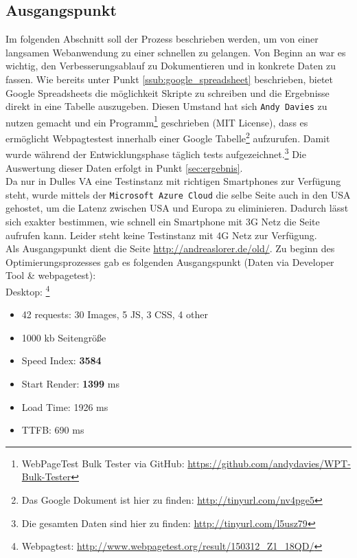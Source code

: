 	\subsection{Ausgangspunkt}
	\label{sub:ausgangspunkt}
		Im folgenden Abschnitt soll der Prozess beschrieben werden, um von einer langsamen Webanwendung zu einer schnellen zu gelangen. Von Beginn an war es wichtig, den Verbesserungsablauf zu Dokumentieren und in konkrete Daten zu fassen. Wie bereits unter Punkt \ref{ssub:google_spreadsheet} beschrieben, bietet Google Spreadsheets die möglichkeit Skripte zu schreiben und die Ergebnisse direkt in eine Tabelle auszugeben. Diesen Umstand hat sich \texttt{Andy Davies} zu nutzen gemacht und ein Programm\footnote{WebPageTest Bulk Tester via GitHub: \url{https://github.com/andydavies/WPT-Bulk-Tester}} geschrieben (MIT License), dass es ermöglicht Webpagtestest innerhalb einer Google Tabelle\footnote{Das Google Dokument ist hier zu finden: \url{http://tinyurl.com/nv4pge5}} aufzurufen. Damit wurde während der Entwicklungsphase täglich tests aufgezeichnet.\footnote{Die gesamten Daten sind hier zu finden: \url{http://tinyurl.com/l5usz79}} Die Auswertung dieser Daten erfolgt in Punkt \ref{sec:ergebnis}.\\

		Da nur in Dulles VA eine Testinstanz mit richtigen Smartphones zur Verfügung steht, wurde mittels der \texttt{Microsoft Azure Cloud} die selbe Seite auch in den USA gehostet, um die Latenz zwischen USA und Europa zu eliminieren. Dadurch lässt sich exakter bestimmen, wie schnell ein Smartphone mit 3G Netz die Seite aufrufen kann. Leider steht keine Testinstanz mit 4G Netz zur Verfügung.\\

		Als Ausgangspunkt dient die Seite \url{http://andreaslorer.de/old/}. Zu beginn des Optimierungsprozesses gab es folgenden Ausgangspunkt (Daten via Developer Tool \& webpagetest):\\

		Desktop: \footnote{Webpagtest: \url{http://www.webpagetest.org/result/150312_Z1_18QD/}}
		\begin{itemize}
			\item 42 requests: 30 Images, 5 JS, 3 CSS, 4 other
			\item 1000 kb Seitengröße
			\item Speed Index: \textbf{3584}
			\item Start Render: \textbf{1399}  ms
			\item Load Time: 1926 ms
			\item TTFB: 690 ms
		\end{itemize}

